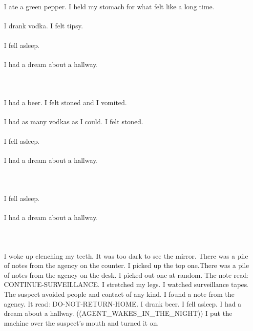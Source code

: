 \documentclass{article}
\begin{document}
    \section{}
    I ate a green pepper. I held my stomach for what felt like a long time.\\\\I drank vodka. I felt tipsy.\\\\I fell asleep.\\\\I had a dream about a hallway.\\\\ 
    \newpage
    
    \section{}
    I had a beer. I felt stoned and I vomited.\\\\I had as many vodkas as I could. I felt stoned.\\\\I fell asleep.\\\\I had a dream about a hallway.\\\\ 
    \newpage
    
    \section{}
    I fell asleep.\\\\I had a dream about a hallway.\\\\ 
    \newpage
    
    \section{}
    I woke up clenching my teeth. It was too dark to see the mirror. There was a pile of notes from the agency on the counter. I picked up the top one.There was a pile of notes from the agency on the desk. I picked out one at random. The note read: CONTINUE-SURVEILLANCE. I stretched my legs. I watched surveillance tapes. The suspect avoided people and contact of any kind. I found a note from the agency. It read: DO-NOT-RETURN-HOME. I drank beer. I fell asleep. I had a dream about a hallway. ((AGENT_WAKES_IN_THE_NIGHT)) I put the machine over the suspect's mouth and turned it on. \\\\
    \newpage
    
\end{document}
